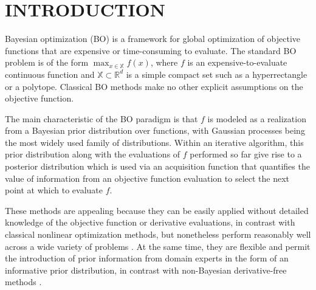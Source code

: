\documentclass{wscpaperproc}
\newcommand{\R}{\mathbb{R}}
\newcommand{\X}{\mathbb{X}}
\theoremstyle{wsc}
\begin{document}
\section{INTRODUCTION}
\label{sec:intro}
Bayesian optimization (BO) is a framework for global optimization of objective functions that are expensive or time-consuming to evaluate.  The standard BO problem is of the form
$\max_{x\in\X}f(x)$,
where $f$ is an expensive-to-evaluate continuous function and $\X\subset \R^d$ is a simple compact set such as a hyperrectangle or a polytope.
Classical BO methods make no other explicit assumptions on the objective function.

The main characteristic of the BO paradigm is that $f$ is modeled as a realization from a Bayesian prior distribution over functions, with Gaussian processes being the most widely used family of distributions. 
Within an iterative algorithm,  this prior distribution along with the evaluations of $f$ performed so far give rise to a posterior distribution which is used via an acquisition function that quantifies the value of information from an objective function evaluation to 
select the next point at which to evaluate $f$. 

These methods are appealing because they can be easily applied without detailed knowledge of the objective function or derivative evaluations, in contrast with classical nonlinear  optimization methods, but nonetheless perform reasonably well across a wide variety of problems . At the same time, they are flexible and permit the introduction of prior information from domain experts in the form of an informative prior distribution, in contrast with non-Bayesian derivative-free methods  .
\end{document}
